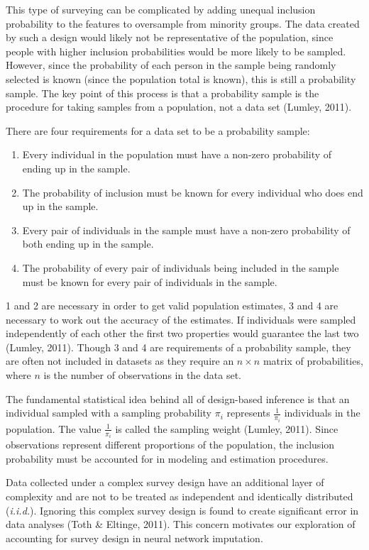 \documentclass[12pt,twoside]{reedthesis}
\begin{document}
This type of surveying can be complicated by adding unequal inclusion
probability to the features to oversample from minority groups. The data
created by such a design would likely not be representative of the
population, since people with higher inclusion probabilities would be
more likely to be sampled. However, since the probability of each person
in the sample being randomly selected is known (since the population
total is known), this is still a probability sample. The key point of
this process is that a probability sample is the procedure for taking
samples from a population, not a data set (Lumley, 2011).

There are four requirements for a data set to be a probability sample:
\begin{enumerate}
\def\labelenumi{\arabic{enumi}.}
\item
  Every individual in the population must have a non-zero probability of
  ending up in the sample.
\item
  The probability of inclusion must be known for every individual who
  does end up in the sample.
\item
  Every pair of individuals in the sample must have a non-zero
  probability of both ending up in the sample.
\item
  The probability of every pair of individuals being included in the
  sample must be known for every pair of individuals in the sample.
\end{enumerate}
1 and 2 are necessary in order to get valid population estimates, 3 and
4 are necessary to work out the accuracy of the estimates. If
individuals were sampled independently of each other the first two
properties would guarantee the last two (Lumley, 2011). Though 3 and 4
are requirements of a probability sample, they are often not included in
datasets as they require an \(n \times n\) matrix of probabilities,
where \(n\) is the number of observations in the data set.

The fundamental statistical idea behind all of design-based inference is
that an individual sampled with a sampling probability \(\pi_i\)
represents \(\frac{1}{\pi_i}\) individuals in the population. The value
\(\frac{1}{\pi_i}\) is called the sampling weight (Lumley, 2011). Since
observations represent different proportions of the population, the
inclusion probability must be accounted for in modeling and estimation
procedures.

Data collected under a complex survey design have an additional layer of
complexity and are not to be treated as independent and identically
distributed (\emph{i.i.d.}). Ignoring this complex survey design is
found to create significant error in data analyses (Toth \& Eltinge,
2011). This concern motivates our exploration of accounting for survey
design in neural network imputation.
\end{document}
